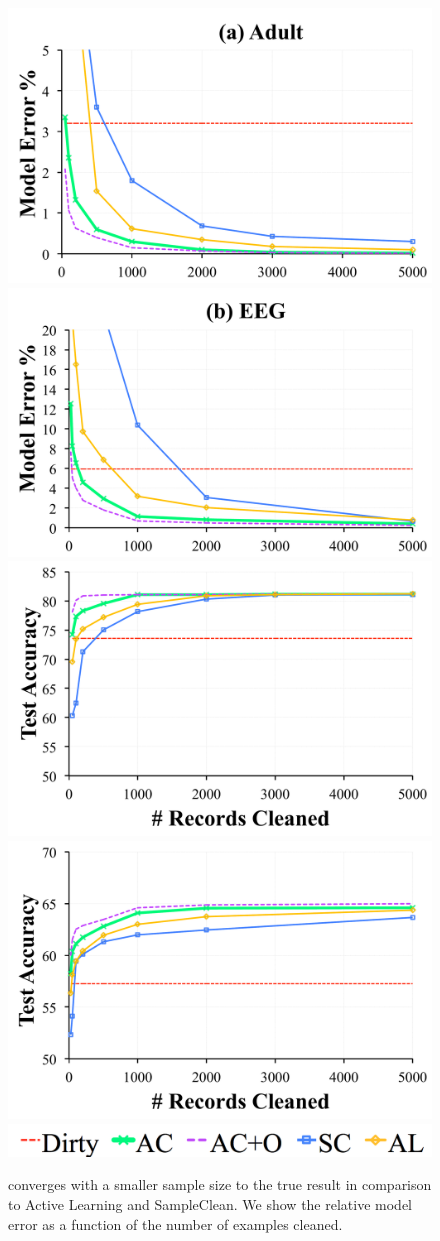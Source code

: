 \begin{figure}[ht!]
\centering\vspace{-1em}
 \includegraphics[width=0.49\columnwidth]{exp/exp3b.pdf}
  \includegraphics[width=0.49\columnwidth]{exp/exp3c.pdf}
  \includegraphics[width=0.49\columnwidth]{exp/exp3bb.pdf}
  \includegraphics[width=0.49\columnwidth]{exp/exp3cc.pdf}
  \includegraphics[width=0.5\columnwidth]{exp/legend-general.png}\vspace{-0.5em}
 \caption{\sys converges with a smaller sample size to the true result in comparison to Active Learning and SampleClean. We show the relative model error as a function of the number of examples cleaned. \label{prio-perf}}\vspace{-1em}
\end{figure}

